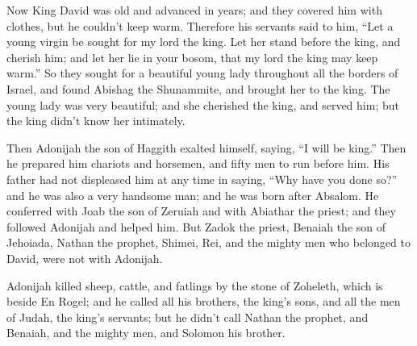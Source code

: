 
\newpage
\null
\thispagestyle{empty}
\newpage







\vspace{-1.36in}


\mychapter{} \myverse*{}Now King David was old and advanced in years; and they covered
him with clothes, but he couldn’t keep warm.
\myverse{}Therefore his servants said to him, “Let a young virgin be sought for my lord
the king. Let her stand before the king, and cherish him; and let her lie in your bosom, that my lord
the king may keep warm.”
\myverse{}So they sought for a beautiful young lady throughout all the borders of Israel,
and found Abishag the Shunammite, and brought her to the king.
\myverse{}The young lady was very beautiful; and she cherished the king, and served him;
but the king didn’t know her intimately.

\myverse{}Then Adonijah the son of Haggith exalted himself, saying, “I will
be king.” Then he prepared him chariots and horsemen, and fifty men to run before him.
\myverse{}His father had not displeased him at any time in saying, “Why have you done
so?” and he was also a very handsome man; and he was born after Absalom.
\myverse{}He conferred with Joab the son of Zeruiah and with Abiathar the priest; and
they followed Adonijah and helped him.
\myverse{}But Zadok the priest, Benaiah the son of Jehoiada, Nathan the prophet, Shimei,
Rei, and the mighty men who belonged to David, were not with Adonijah.

\myverse{}Adonijah killed sheep, cattle, and fatlings by the stone of Zoheleth,
which is beside En Rogel; and he called all his brothers, the king’s sons, and all the men of Judah, the
king’s servants;
\myverse{}but he didn’t call Nathan the prophet, and Benaiah, and the mighty men, and
Solomon his brother.

